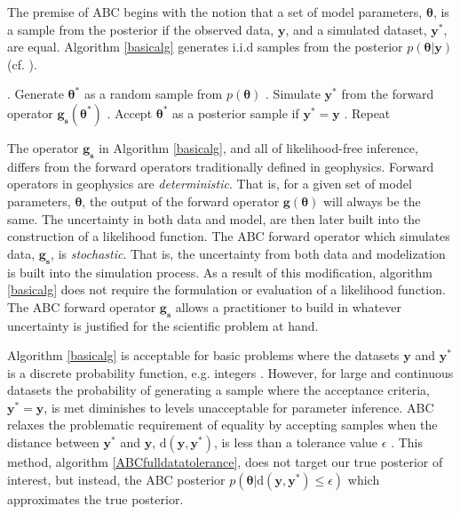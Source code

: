 The premise of ABC begins with the notion that a set of model parameters, $\bm{\theta}$, is a sample from the posterior if the observed data, $\bm{y}$, and a simulated dataset, $\bm{y^*}$, are equal. Algorithm \ref{basicalg} generates i.i.d samples from the posterior $p(\bm{\theta}|\bm{y})$ (cf. \citet{Marjoram2003}).

\begin{algorithm}[H]
	\caption{ }
	\begin{algorithmic}
		. Generate $\bm{\theta^*}$ as a random sample from $p(\bm{\theta})$		
		. Simulate $\bm{y^*}$ from the forward operator $\bm{g_s}(\bm{\theta^*})$		
		. Accept $\bm{\theta^*}$ as a posterior sample if $\bm{y^*} = \bm{y}$		
		. Repeat
	\end{algorithmic}
	\label{basicalg}
\end{algorithm}

The operator $\bm{g_s}$ in Algorithm \ref{basicalg}, and all of likelihood-free inference, differs from the forward operators traditionally defined in geophysics. Forward operators in geophysics are \textit{deterministic}. That is, for a given set of model parameters, $\bm{\theta}$, the output of the forward operator $\bm{g}(\bm{\theta})$ will always be the same. The uncertainty in both data and model, are then later built into the construction of a likelihood function. The ABC forward operator which simulates data, $\bm{g_s}$, is \textit{stochastic}. That is, the uncertainty from both data and modelization is built into the simulation process. As a result of this modification, algorithm \ref{basicalg} does not require the formulation or evaluation of a likelihood function. The ABC forward operator $\bm{g_s}$ allows a practitioner to build in whatever uncertainty is justified for the scientific problem at hand. \par

Algorithm \ref{basicalg} is acceptable for basic problems where the datasets $\bm{y}$ and $\bm{y^*}$ is a discrete probability function, e.g. integers \citep{Tavare1997,Fu1997}. However, for large and continuous datasets the probability of generating a sample where the acceptance criteria, $\bm{y^*} = \bm{y}$, is met diminishes to levels unacceptable for parameter inference. ABC relaxes the problematic requirement of equality by accepting samples when the distance between $\bm{y^*}$ and $\bm{y}$, $\text{d}(\bm{y},\bm{y^*})$, is less than a tolerance value $\epsilon$ \citep{Weiss1998a}. This method, algorithm \ref{ABCfulldatatolerance}, does not target our true posterior of interest, but instead, the ABC posterior $p(\bm{\theta}|\text{d}(\bm{y},\bm{y^*})\leq\epsilon)$ which approximates the true posterior. 

